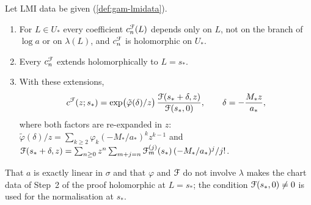 
\begin{thm}
\label{thm:gam-lmi}
Let LMI data be given (\cref{def:gam-lmidata}).
\begin{enumerate}
\item For $L\in U_*$ every coefficient $c^{\mathcal{F}}_n(L)$ depends only on $L$, not on the branch of $\log a$ or on $\lambda(L)$, and $c^{\mathcal{F}}_n$ is holomorphic on $U_*$.
\item Every $c^{\mathcal{F}}_n$ extends holomorphically to $L=s_*$.
\item With these extensions,
\begin{equation}
\label{eq:gam-lmi}
c^{\mathcal{F}}(z;s_*)=\exp\bigl(\tilde\varphi(\delta)/z\bigr)\,\frac{\mathcal{F}(s_*+\delta,z)}{\mathcal{F}(s_*,0)},\qquad \delta=-\frac{M_*z}{a_*},
\end{equation}
where both factors are re-expanded in $z$: $\tilde\varphi(\delta)/z=\sum_{k\geq 2}\varphi_k(-M_*/a_*)^kz^{k-1}$ and $\mathcal{F}(s_*+\delta,z)=\sum_{n\geq 0}z^n\sum_{m+j=n}\mathcal{F}_m^{(j)}(s_*)\,(-M_*/a_*)^j/j!$.
\end{enumerate}
\end{thm}

That $a$ is exactly linear in $\sigma$ and that $\varphi$ and $\mathcal{F}$ do not involve $\lambda$ makes the chart data of Step~2 of the proof holomorphic at $L=s_*$; the condition $\mathcal{F}(s_*,0)\neq 0$ is used for the normalisation at $s_*$.

